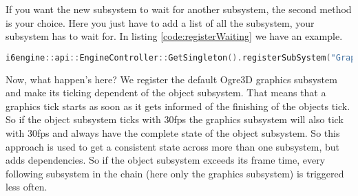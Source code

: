 \documentclass{article}
\begin{document}
If you want the new subsystem to wait for another subsystem, the second method is your choice. Here you just have to add a list of all the subsystem, your subsystem has to wait for. In listing \ref{code:registerWaiting} we have an example.

\begin{lstlisting}[language=C++, style=basic, caption={registering graphics subsystem waiting for object subsystem}, label=code:registerWaiting]
i6engine::api::EngineController::GetSingleton().registerSubSystem("Graphic", new i6engine::modules::GraphicsController(), { i6engine::core::Subsystem::Object });
\end{lstlisting}

Now, what happen's here? We register the default Ogre3D graphics subsystem and make its ticking dependent of the object subsystem. That means that a graphics tick starts as soon as it gets informed of the finishing of the objects tick. So if the object subsystem ticks with 30fps the graphics subsystem will also tick with 30fps and always have the complete state of the object subsystem. So this approach is used to get a consistent state across more than one subsystem, but adds dependencies. So if the object subsystem exceeds its frame time, every following subsystem in the chain (here only the graphics subsystem) is triggered less often.
\end{document}
